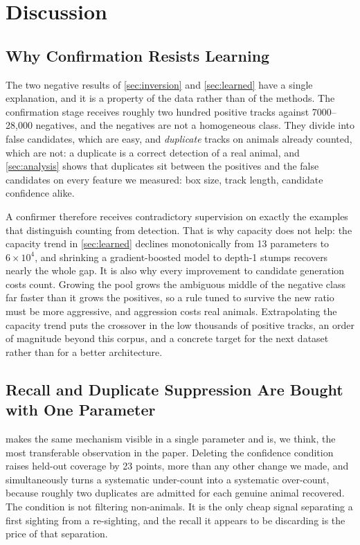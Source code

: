 \section{Discussion}
\label{sec:discussion}

\subsection{Why Confirmation Resists Learning}

The two negative results of \cref{sec:inversion} and \cref{sec:learned} have a single
explanation, and it is a property of the data rather than of the methods. The confirmation
stage receives roughly two hundred positive tracks against 7000--28,000 negatives, and the
negatives are not a homogeneous class. They divide into false candidates, which are easy,
and \emph{duplicate} tracks on animals already counted, which are not: a duplicate is a
correct detection of a real animal, and \cref{sec:analysis} shows that duplicates sit
between the positives and the false candidates on every feature we measured: box size, track length, candidate confidence alike.

A confirmer therefore receives contradictory supervision on exactly the examples that
distinguish counting from detection. That is why capacity does not help: the capacity trend in \cref{sec:learned} declines monotonically from 13 parameters to $6\times10^4$, and
shrinking a gradient-boosted model to depth-1 stumps recovers nearly the whole gap. It is also why every improvement to candidate generation costs count. Growing the pool grows the
ambiguous middle of the negative class far faster than it grows the positives, so a rule
tuned to survive the new ratio must be more aggressive, and aggression costs real animals.
Extrapolating the capacity trend puts the crossover in the low thousands of positive
tracks, an order of magnitude beyond this corpus, and a concrete target for the next
dataset rather than for a better architecture.

\subsection{Recall and Duplicate Suppression Are Bought with One Parameter}

 makes the same mechanism visible in a single parameter and is, we
think, the most transferable observation in the paper. Deleting the confidence condition
raises held-out coverage by 23 points, more than any other change we made, and simultaneously
turns a systematic under-count into a systematic over-count, because roughly two duplicates
are admitted for each genuine animal recovered. The condition is not filtering non-animals.
It is the only cheap signal separating a first sighting from a re-sighting, and the recall it
appears to be discarding is the price of that separation.


